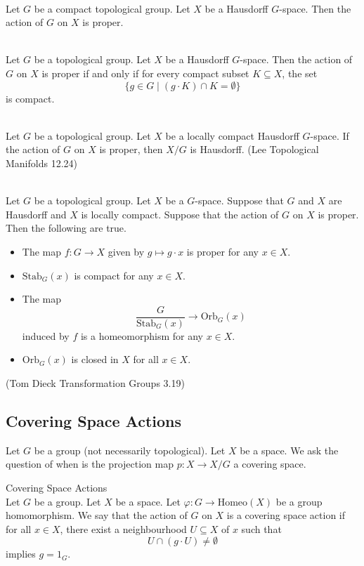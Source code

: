 \documentclass[a4paper]{article}
\begin{document}
\begin{lmm}{}{}\\
Let $G$ be a compact topological group. Let $X$ be a Hausdorff $G$-space. Then the action of $G$ on $X$ is proper. 
\end{lmm}

\begin{prp}{}{}\\
Let $G$ be a topological group. Let $X$ be a Hausdorff $G$-space. Then the action of $G$ on $X$ is proper if and only if for every compact subset $K\subseteq X$, the set $$\{g\in G\;|\;(g\cdot K)\cap K=\emptyset\}$$ is compact. 
\end{prp}

\begin{prp}{}{}\\
Let $G$ be a topological group. Let $X$ be a locally compact Hausdorff $G$-space. If the action of $G$ on $X$ is proper, then $X/G$ is Hausdorff. (Lee Topological Manifolds 12.24)
\end{prp}

\begin{prp}{}{}\\
Let $G$ be a topological group. Let $X$ be a $G$-space. Suppose that $G$ and $X$ are Hausdorff and $X$ is locally compact. Suppose that the action of $G$ on $X$ is proper. Then the following are true. 
\begin{itemize}
\item The map $f:G\to X$ given by $g\mapsto g\cdot x$ is proper for any $x\in X$. 
\item $\text{Stab}_G(x)$ is compact for any $x\in X$. 
\item The map $$\frac{G}{\text{Stab}_G(x)}\to\text{Orb}_G(x)$$ induced by $f$ is a homeomorphism for any $x\in X$. 
\item $\text{Orb}_G(x)$ is closed in $X$ for all $x\in X$. 
\end{itemize} (Tom Dieck Transformation Groups 3.19)
\end{prp}

\subsection{Covering Space Actions}
Let $G$ be a group (not necessarily topological). Let $X$ be a space. We ask the question of when is the projection map $p:X\to X/G$ a covering space. 

\begin{defn}{Covering Space Actions}{}\\
Let $G$ be a group. Let $X$ be a space. Let $\varphi:G\to\text{Homeo}(X)$ be a group homomorphism. We say that the action of $G$ on $X$ is a covering space action if for all $x\in X$, there exist a neighbourhood $U\subseteq X$ of $x$ such that $$U\cap(g\cdot U)\neq\emptyset$$ implies $g=1_G$. 
\end{defn}
\end{document}
